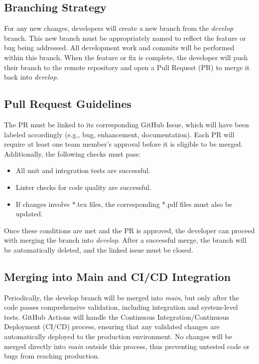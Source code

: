 \documentclass{article}
\begin{document}
\subsection*{Branching Strategy}
For any new changes, developers will create a new branch from the
\textit{develop} branch. This new branch must be appropriately named to reflect
the feature or bug being addressed. All development work and commits will be
performed within this branch. When the feature or fix is complete, the developer
will push their branch to the remote repository and open a Pull Request (PR) to
merge it back into \textit{develop}.

\subsection*{Pull Request Guidelines}
The PR must be linked to its corresponding GitHub Issue, which will have been
labeled accordingly (e.g., bug, enhancement, documentation). Each PR will
require at least one team member's approval before it is eligible to be merged.
Additionally, the following checks must pass:

\begin{itemize}
    \item All unit and integration tests are successful.
    \item Linter checks for code quality are successful.
    \item If changes involve *.tex files, the corresponding *.pdf files must
    also be updated.
\end{itemize}

Once these conditions are met and the PR is approved, the developer can proceed
with merging the branch into \textit{develop}. After a successful merge, the
branch will be automatically deleted, and the linked issue must be closed.

\subsection*{Merging into Main and CI/CD Integration}
Periodically, the develop branch will be merged into \textit{main}, but only
after the code passes comprehensive validation, including integration and
system-level tests. GitHub Actions will handle the Continuous
Integration/Continuous Deployment (CI/CD) process, ensuring that any validated
changes are automatically deployed to the production environment. No changes
will be merged directly into \textit{main} outside this process, thus preventing
untested code or bugs from reaching production.
\end{document}

